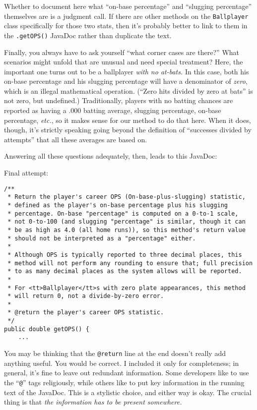 Whether to document here what ``on-base percentage'' and ``slugging percentage''
themselves are is a judgment call. If there are other methods on the
\texttt{Ballplayer} class specifically for those two stats, then it's probably
better to link to them in the \texttt{.getOPS()} JavaDoc rather than duplicate
the text.

\label{corner case}
Finally, you always have to ask yourself ``what corner cases are there?'' What
scenarios might unfold that are unusual and need special treatment? Here, the
important one turns out to be a ballplayer \textit{with no at-bats.} In this
case, both his on-base percentage and his slugging percentage will have a
denominator of \textit{zero}, which is an illegal mathematical operation.
(``Zero hits divided by zero at bats'' is not zero, but undefined.)
Traditionally, players with no batting chances are reported as having a .000
batting average, slugging percentage, on-base percentage, \textit{etc.}, so it
makes sense for our method to do that here. When it does, though, it's
strictly speaking going beyond the definition of ``successes divided by
attempts'' that all these averages are based on.

Answering all these questions adequately, then, leads to this JavaDoc:

Final attempt:
\vspace{-.15in}
\begin{Verbatim}[fontsize=\scriptsize,samepage=true,frame=single]
/**
 * Return the player's career OPS (On-base-plus-slugging) statistic,
 * defined as the player's on-base percentage plus his slugging 
 * percentage. On-base "percentage" is computed on a 0-to-1 scale,
 * not 0-to-100 (and slugging "percentage" is similar, though it can
 * be as high as 4.0 (all home runs)), so this method's return value
 * should not be interpreted as a "percentage" either.
 * 
 * Although OPS is typically reported to three decimal places, this
 * method will not perform any rounding to ensure that; full precision
 * to as many decimal places as the system allows will be reported.
 *
 * For <tt>Ballplayer</tt>s with zero plate appearances, this method
 * will return 0, not a divide-by-zero error.
 *
 * @return the player's career OPS statistic.
 */
public double getOPS() {
    ...
\end{Verbatim}

You may be thinking that the \texttt{@return} line at the end doesn't really
add anything useful. You would be correct. I included it only for
completeness; in general, it's fine to leave out redundant information. Some
developers like to use the ``\texttt{@}'' tags religiously, while others like
to put key information in the running text of the JavaDoc. This is a stylistic
choice, and either way is okay. The crucial thing is that \textit{the
information has to be present somewhere.}

